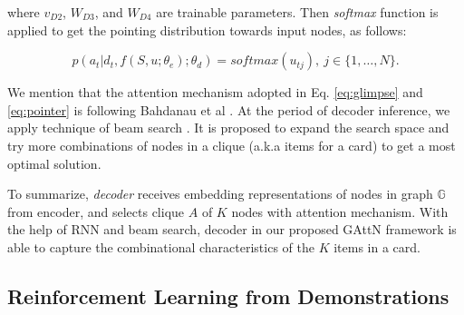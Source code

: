 where $v_{D2}$, $W_{D3}$, and $W_{D4}$ are trainable parameters.
Then \emph{softmax} function is applied to get the pointing distribution towards input nodes, as follows:
\begin{small}
\begin{equation}
p(a_t|d_t,f(S,u;\theta_e);\theta_d)=softmax(u_{tj}),\ j\in\{1,\dots,N\}.
\end{equation}
\end{small}
We mention that the attention mechanism adopted in Eq. \ref{eq:glimpse} and \ref{eq:pointer} is following Bahdanau et al \cite{bahdanau2014neural}.
At the period of decoder inference, we apply technique of beam search \cite{vinyals2015show}.
It is proposed to expand the search space and try more combinations of nodes in a clique (a.k.a items for a card) to get a most optimal solution.

To summarize, \emph{decoder} receives embedding representations of nodes in graph $\mathbb{G}$ from encoder, and selects clique $A$ of $K$ nodes with attention mechanism.
With the help of RNN and beam search, decoder in our proposed GAttN framework is able to capture the combinational characteristics of the $K$ items in a card.


\subsection{Reinforcement Learning from Demonstrations}
\label{sec:rlfd}
